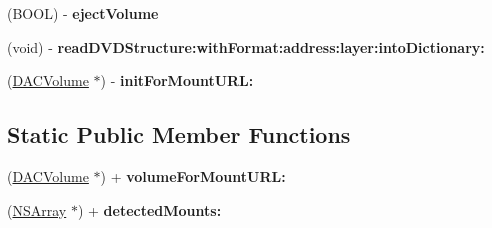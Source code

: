 \begin{DoxyCompactItemize}
\item 
\hypertarget{interface_d_a_c_volume_ac842254fa9eb29625a4727f0473df400}{
(BOOL) -\/ {\bfseries ejectVolume}}
\label{interface_d_a_c_volume_ac842254fa9eb29625a4727f0473df400}

\item 
\hypertarget{interface_d_a_c_volume_aca85c4eaec2edf253f185437dc7f7d31}{
(void) -\/ {\bfseries readDVDStructure:withFormat:address:layer:intoDictionary:}}
\label{interface_d_a_c_volume_aca85c4eaec2edf253f185437dc7f7d31}

\item 
\hypertarget{interface_d_a_c_volume_a217f90394135d3f15a4b0dc4cdcaa269}{
(\hyperlink{interface_d_a_c_volume}{DACVolume} $\ast$) -\/ {\bfseries initForMountURL:}}
\label{interface_d_a_c_volume_a217f90394135d3f15a4b0dc4cdcaa269}

\end{DoxyCompactItemize}
\subsection*{Static Public Member Functions}
\begin{DoxyCompactItemize}
\item 
\hypertarget{interface_d_a_c_volume_ad4baa638444d8b6452309d3f58bff189}{
(\hyperlink{interface_d_a_c_volume}{DACVolume} $\ast$) + {\bfseries volumeForMountURL:}}
\label{interface_d_a_c_volume_ad4baa638444d8b6452309d3f58bff189}

\item 
\hypertarget{interface_d_a_c_volume_a49e9650deed87fb00d705e2a5e7ab0bc}{
(\hyperlink{class_n_s_array}{NSArray} $\ast$) + {\bfseries detectedMounts:}}
\label{interface_d_a_c_volume_a49e9650deed87fb00d705e2a5e7ab0bc}

\end{DoxyCompactItemize}
